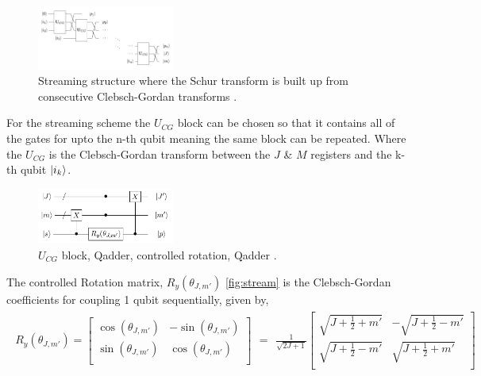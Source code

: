 \documentclass[12pt]{article}
\begin{document}
\begin{figure}[h!]
\centering
\includegraphics[width=0.4\textwidth]{schurcascade.png}
\caption{Streaming structure where the Schur transform is built up from consecutive Clebsch-Gordan transforms \cite{bacon2006efficient}.}
\label{fig:stream}
\end{figure}

For the streaming scheme the $U_{CG}$ block can be chosen so that it contains all of the gates for upto the n-th qubit meaning the same block can be repeated. Where the $U_{CG}$ is the Clebsch-Gordan transform between the $J$ \& $M$ registers and the k-th qubit $\left\vert{i_k}\right\rangle$.


\begin{figure}[h!]
\centering
\includegraphics[width=0.4\textwidth]{genaddercirc.png}
\caption{$U_{CG}$ block, Qadder, controlled rotation, Qadder \cite{bacon2006efficient}.}
\label{fig:ucg}
\end{figure}

The controlled Rotation matrix, $R_y(\theta_{J,m'})$ \autoref{fig:stream} is the Clebsch-Gordan coefficients for coupling 1 qubit sequentially, given by,
\begin{align}
\begin{split}
R_y(\theta_{J,m'})=
\begin{bmatrix}
\cos(\theta_{J,m'}) &-\sin(\theta_{J,m'}) \\
\sin(\theta_{J,m'}) & \cos(\theta_{J,m'}) \\
\end{bmatrix}
\end{split}
=
\begin{split}
\frac{1}{\sqrt{2J+1}}
\begin{bmatrix}
\sqrt{J+\frac{1}{2}+m'} &-\sqrt{J+\frac{1}{2}-m'} \\
\sqrt{J+\frac{1}{2}-m'} & \sqrt{J+\frac{1}{2}+m'} \\
\end{bmatrix}
\end{split}
\label{eq:rotmatrix}
\end{align}
\end{document}
